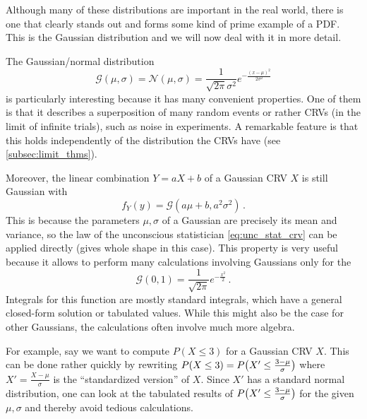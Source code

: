 Although many of these distributions are important in the real world, there is one that clearly stands out and forms some kind of prime example of a PDF. This is the Gaussian distribution and we will now deal with it in more detail.

\begin{ex}
The Gaussian/normal distribution
\begin{equation*}
\mathcal{G}(\mu, \sigma) = \mathcal{N}(\mu, \sigma) = \frac{1}{\sqrt{2 \pi} \sigma^2} e^{- \frac{(x - \mu)^2}{2\sigma^2}}
\end{equation*}
is particularly interesting because it has many convenient properties. One of them is that it describes a superposition of many random events or rather CRVs (in the limit of infinite trials), such as noise in experiments. A remarkable feature is that this holds independently of the distribution the CRVs have (see \ref{subsec:limit_thms}).

Moreover, the linear combination $Y = a X + b$ of a Gaussian CRV $X$ is still Gaussian with
\begin{equation}
f_Y(y) = \mathcal{G}(a \mu + b, a^2 \sigma^2) \, .
\end{equation}
This is because the parameters $\mu, \sigma$ of a Gaussian are precisely its mean and variance, so the law of the unconscious statistician \eqref{eq:unc_stat_crv} can be applied directly (gives whole shape in this case). This property is very useful because it allows to perform many calculations involving Gaussians only for the 
\begin{equation}
\mathcal{G}(0, 1) = \frac{1}{\sqrt{2 \pi}} e^{- \frac{x^2}{2}} \, .
\end{equation}
Integrals for this function are mostly standard integrals, which have a general closed-form solution or tabulated values. While this might also be the case for other Gaussians, the calculations often involve much more algebra.

For example, say we want to compute $P(X \leq 3)$ for a Gaussian CRV $X$. This can be done rather quickly by rewriting $P(X \leq 3) = P\qty(X' \leq \frac{3 - \mu}{\sigma})$ where $X' = \frac{X - \mu}{\sigma}$ is the \enquote{standardized version} of $X$. Since $X'$ has a standard normal distribution, one can look at the tabulated results of $P\qty(X' \leq \frac{3 - \mu}{\sigma})$ for the given $\mu, \sigma$ and thereby avoid tedious calculations.
\end{ex}


